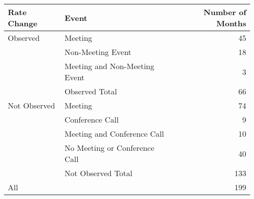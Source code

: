 \begin{tabular}{llr}
\toprule
  Rate Change &                          Event &  Number of Months \\
\midrule
     Observed &                        Meeting &                45 \\
              &              Non-Meeting Event &                18 \\
              &  Meeting and Non-Meeting Event &                 3 \\
              &                 Observed Total &                66 \\
 \hline Not Observed &                        Meeting &                74 \\
              &                Conference Call &                 9 \\
              &    Meeting and Conference Call &                10 \\
              &  No Meeting or Conference Call &                40 \\
              &             Not Observed Total &               133 \\
          \hline\hline All &                                &               199 \\
\bottomrule
\end{tabular}
